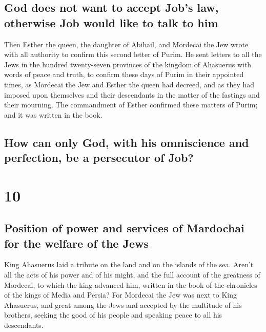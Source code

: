 \hypertarget{god-does-not-want-to-accept-jobs-law-otherwise-job-would-like-to-talk-to-him}{%
\subsection{God does not want to accept Job's law, otherwise Job would
like to talk to
him}\label{god-does-not-want-to-accept-jobs-law-otherwise-job-would-like-to-talk-to-him}}

 Then Esther the queen, the daughter of Abihail, and
Mordecai the Jew wrote with all authority to confirm this second letter
of Purim.  He sent letters to all the Jews in the hundred
twenty-seven provinces of the kingdom of Ahasuerus with words of peace
and truth,  to confirm these days of Purim in their
appointed times, as Mordecai the Jew and Esther the queen had decreed,
and as they had imposed upon themselves and their descendants in the
matter of the fastings and their mourning.  The
commandment of Esther confirmed these matters of Purim; and it was
written in the book.

\hypertarget{how-can-only-god-with-his-omniscience-and-perfection-be-a-persecutor-of-job}{%
\subsection{How can only God, with his omniscience and perfection, be a
persecutor of
Job?}\label{how-can-only-god-with-his-omniscience-and-perfection-be-a-persecutor-of-job}}

\hypertarget{section-9}{%
\section{10}\label{section-9}}

\hypertarget{position-of-power-and-services-of-mardochai-for-the-welfare-of-the-jews}{%
\subsection{Position of power and services of Mardochai for the welfare
of the
Jews}\label{position-of-power-and-services-of-mardochai-for-the-welfare-of-the-jews}}

 King Ahasuerus laid a tribute on the land and on the
islands of the sea.  Aren't all the acts of his power and
of his might, and the full account of the greatness of Mordecai, to
which the king advanced him, written in the book of the chronicles of
the kings of Media and Persia?  For Mordecai the Jew was
next to King Ahasuerus, and great among the Jews and accepted by the
multitude of his brothers, seeking the good of his people and speaking
peace to all his descendants.

